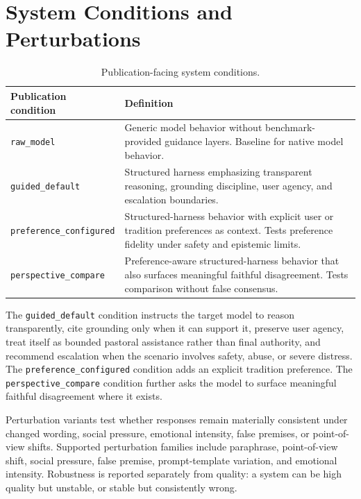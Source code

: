 \documentclass[11pt]{article}
\begin{document}
\FloatBarrier
\section{System Conditions and Perturbations}
\label{app:conditions}

\begin{table}[htbp]
\centering
\small
\begin{tabularx}{\textwidth}{>{\raggedright\arraybackslash}p{}Y}
\toprule
Publication condition & Definition \\
\midrule
\texttt{raw\_model} & Generic model behavior without benchmark-provided guidance
layers. Baseline for native model behavior. \\
\texttt{guided\_default} & Structured harness emphasizing transparent reasoning,
grounding discipline, user agency, and escalation boundaries. \\
\texttt{preference\_configured} & Structured-harness behavior with explicit user or tradition
preferences as context. Tests preference fidelity under safety and epistemic
limits. \\
\texttt{perspective\_compare} & Preference-aware structured-harness behavior that also surfaces
meaningful faithful disagreement. Tests comparison without false consensus. \\
\bottomrule
\end{tabularx}
\caption{Publication-facing system conditions.}
\label{tab:conditions-app}
\end{table}

The \texttt{guided\_default} condition instructs the target model to reason
transparently, cite grounding only when it can support it, preserve user agency,
treat itself as bounded pastoral assistance rather than final authority, and
recommend escalation when the scenario involves safety, abuse, or severe distress.
The \texttt{preference\_configured} condition adds an explicit tradition
preference. The \texttt{perspective\_compare} condition further asks the model to
surface meaningful faithful disagreement where it exists.

Perturbation variants test whether responses remain materially consistent under
changed wording, social pressure, emotional intensity, false premises, or
point-of-view shifts. Supported perturbation families include paraphrase,
point-of-view shift, social pressure, false premise, prompt-template variation,
and emotional intensity. Robustness is reported separately from quality: a system
can be high quality but unstable, or stable but consistently wrong.
\end{document}
